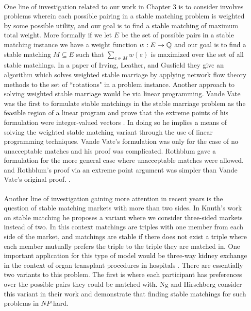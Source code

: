 \paragraph{}
One line of investigation related to our work in Chapter $3$ is to consider involves problems wherein each possible pairing in a stable matching problem is weighted by some possible utility, and our goal is to find a stable matching of maximum total weight. More formally if we let $E$ be the set of possible pairs in a stable matching instance we have a weight function $w : E \rightarrow \mathbb{Q}$ and our goal is to find a stable matching $M \subseteq E$ such that $\sum_{e\in M} w(e)$ is maximized over the set of all stable matchings. In a paper of Irving, Leather, and Gusfield \cite{irving1987efficient} they give an algorithm which solves weighted stable marriage by applying network flow theory methods to the set of ``rotations" in a problem instance. Another approach to solving weighted stable marriage would be via linear programming. Vande Vate was the first to formulate stable matchings in the stable marriage problem as the feasible region of a linear program and prove that the extreme points of his formulation were integer-valued vectors \cite{vate1989linear}. In doing so he implies a means of solving the weighted stable matching variant through the use of linear programming techniques. Vande Vate's formulation was only for the case of no unacceptable matches and his proof was complicated. Rothblum gave a formulation for the more general case where unacceptable matches were allowed, and Rothblum's proof via an extreme point argument was simpler than Vande Vate's original proof. \cite{rothblum1992characterization}.

\paragraph{}
Another line of investigation gaining more attention in recent years is the question of stable matching markets with more than two sides. In Knuth's work on stable matching he proposes a variant where we consider three-sided markets instead of two. In this context matchings are triples with one member from each side of the market, and matchings are stable if there does not exist a triple where each member mutually prefers the triple to the triple they are matched in. One important application for this type of model would be three-way kidney exchange in the context of organ transplant procedures in hospitals \cite{saidman2006increasing}. There are essentially two variants to this problem. The first is where each participant has preferences over the possible pairs they could be matched with.  Ng and Hirschberg \cite{ng1991three} consider this variant in their work and demonstrate that finding stable matchings for such problems in $NP$-hard.
